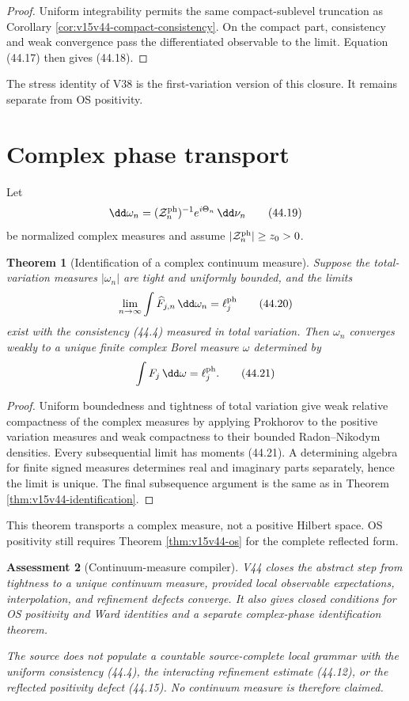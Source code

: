 \documentclass[11pt]{article}
\newtheorem{theorem}{Theorem}[section]
\newtheorem{assessment}[theorem]{Assessment}
\theoremstyle{remark}
\begin{document}
\begin{proof}
Uniform integrability permits the same compact-sublevel truncation
as Corollary \ref{cor:v15v44-compact-consistency}.  On the compact
part, consistency and weak convergence pass the differentiated
observable to the limit.  Equation (44.17) then gives (44.18).
\end{proof}

The stress identity of V38 is the first-variation version of this
closure.  It remains separate from OS positivity.

\section{Complex phase transport}

Let
\[
 \dd\omega_n=
 ({\cal Z}_n^{\rm ph})^{-1}e^{i\Theta_n}\,\dd\nu_n       \tag{44.19}
\]
be normalized complex measures and assume
\(|{\cal Z}_n^{\rm ph}|\geq z_0>0\).

\begin{theorem}[Identification of a complex continuum measure]
\label{thm:v15v44-complex}
Suppose the total-variation measures \(|\omega_n|\) are tight and
uniformly bounded, and the limits
\[
 \lim_{n\to\infty}\int\widehat F_{j,n}\,\dd\omega_n
 =\ell_j^{\rm ph}                                       \tag{44.20}
\]
exist with the consistency (44.4) measured in total variation.
Then \(\omega_n\) converges weakly to a unique finite complex Borel
measure \(\omega\) determined by
\[
 \int F_j\,\dd\omega=\ell_j^{\rm ph}.                   \tag{44.21}
\]
\end{theorem}

\begin{proof}
Uniform boundedness and tightness of total variation give weak
relative compactness of the complex measures by applying
Prokhorov to the positive variation measures and weak compactness
to their bounded Radon--Nikodym densities.  Every subsequential
limit has moments (44.21).  A determining algebra for finite signed
measures determines real and imaginary parts separately, hence the
limit is unique.  The final subsequence argument is the same as in
Theorem \ref{thm:v15v44-identification}.
\end{proof}

This theorem transports a complex measure, not a positive Hilbert
space.  OS positivity still requires Theorem
\ref{thm:v15v44-os} for the complete reflected form.

\begin{assessment}[Continuum-measure compiler]
\label{ass:v15v44-compiler}
V44 closes the abstract step from tightness to a unique continuum
measure, provided local observable expectations, interpolation, and
refinement defects converge.  It also gives closed conditions for
OS positivity and Ward identities and a separate complex-phase
identification theorem.

The source does not populate a countable source-complete local
grammar with the uniform consistency (44.4), the interacting
refinement estimate (44.12), or the reflected positivity defect
(44.15).  No continuum measure is therefore claimed.
\end{assessment}
\end{document}
